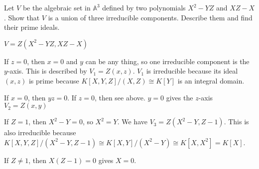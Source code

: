 \begin{exercise}[1.3.]
    Let \(V\) be the algebraic set in \(\mathbb{A}^3\) defined by two polynomials \(X^2 - YZ\) and \(XZ - X\). Show that \(V\) is a union of three irreducible components. Describe them and find their prime ideals.
\end{exercise}
\begin{solution}
    \(V = Z(X^2 - YZ, XZ - X)\)

    If \(z = 0\), then \(x = 0\) and \(y\) can be any thing, so one irreducible component is the \(y\)-axis. This is described by \(V_1 = Z(x, z)\). \(V_1\) is irreducible because its ideal \((x, z)\) is prime because \(K[X, Y, Z] / (X, Z) \cong K[Y]\) is an integral domain.

    If \(x = 0\), then \(yz = 0\). If \(z = 0\), then see above. \(y = 0\) gives the \(z\)-axis \(V_2 = Z(x, y)\)

    If \(Z = 1\), then \(X^2 - Y = 0\), so \(X^2 = Y\). We have \(V_3 = Z(X^2 - Y, Z - 1)\). This is also irreducible because \(K[X, Y, Z]/(X^2 - Y, Z - 1) \cong K[X, Y]/(X^2 - Y) \cong K[X, X^2] = K[X]\).


    If \(Z \neq 1\), then \(X(Z - 1) = 0\) gives \(X = 0\).



\end{solution}

